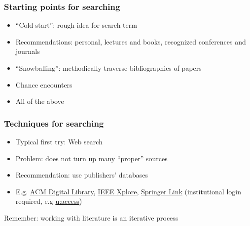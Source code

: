 \documentclass[]{beamer} %
\begin{document}
\begin{frame}
\frametitle{Starting points for searching}
\begin{itemize}
	\item ``Cold start'': rough idea for search term
	\item Recommendations: personal, lectures and books, recognized conferences and journals
	\item ``Snowballing'': methodically traverse bibliographies of papers \cite{snowballing}
	\item Chance encounters
	\item \alert{All of the above}
\end{itemize}
\end{frame}

\begin{frame}
\frametitle{Techniques for searching}
\small
\begin{itemize}
	\item Typical first try: Web search
	\item Problem: does not turn up many ``proper'' sources
	\item Recommendation: use publishers' databases
	\item E.g. \href{https://dl.acm.org/}{ACM Digital Library}, \href{https://ieeexplore.ieee.org/}{IEEE Xplore}, \href{https://link.springer.com/}{Springer Link} (institutional login required, e.g \href{https://uaccess.univie.ac.at/}{u:access})
\end{itemize}
\alert{Remember:} working with literature is an iterative process
\end{frame}
\end{document}
